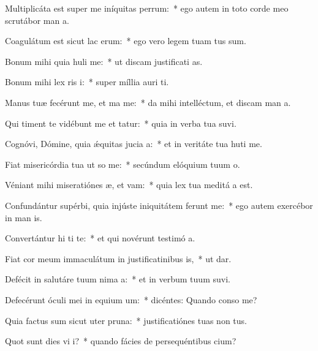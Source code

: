\item Multiplicáta est super me iníquitas perrum:~* ego autem in toto corde meo scrutábor man a.
\item Coagulátum est sicut lac  erum:~* ego vero legem tuam tus sum.
\item Bonum mihi quia huli me:~* ut discam justificati as.
\item Bonum mihi lex ris i:~* super míllia auri  ti.
\item Manus tuæ fecérunt me, et ma me:~* da mihi intelléctum, et discam man a.
\item Qui timent te vidébunt me et tatur:~* quia in verba tua suvi.
\item Cognóvi, Dómine, quia ǽquitas jucia a:~* et in veritáte tua huti me.
\item Fiat misericórdia tua ut so me:~* secúndum elóquium tuum  o.
\item Véniant mihi miseratiónes æ, et vam:~* quia lex tua meditá a est.
\item Confundántur supérbi, quia injúste iniquitátem ferunt  me:~* ego autem exercébor in man is.
\item Convertántur hi ti te:~* et qui novérunt testimó a.
\item Fiat cor meum immaculátum in justificatinibus is,~* ut  dar.
\item Defécit in salutáre tuum nima a:~* et in verbum tuum suvi.
\item Defecérunt óculi mei in equium um:~* dicéntes: Quando conso me?
\item Quia factus sum sicut uter  pruna:~* justificatiónes tuas non  tus.
\item Quot sunt dies vi i?~* quando fácies de persequéntibus  cium?
